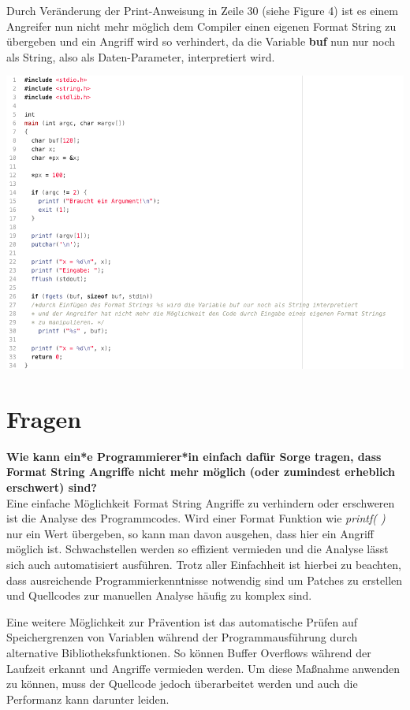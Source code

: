 \documentclass[12pt,a4paper]{article}
\begin{document}
	Durch Veränderung der Print-Anweisung in Zeile 30 (siehe Figure 4) ist es einem Angreifer nun nicht mehr möglich dem Compiler einen eigenen Format String zu übergeben und ein Angriff wird so verhindert, da die Variable \textbf{buf} nun nur noch als String, also als Daten-Parameter, interpretiert wird.

\begin{center}
	\includegraphics[scale=0.4]{betterCode.png}
\end{center}
	
	\section*{Fragen}
	\textbf{Wie kann ein*e Programmierer*in einfach dafür Sorge tragen, dass Format String Angriffe nicht mehr möglich (oder zumindest erheblich erschwert) sind?} \\
	Eine einfache Möglichkeit Format String Angriffe zu verhindern oder erschweren ist die Analyse des Programmcodes. Wird einer Format Funktion wie \textit{printf( )} nur ein Wert übergeben, so kann man davon ausgehen, dass hier ein Angriff möglich ist. Schwachstellen werden so effizient vermieden und die Analyse lässt sich auch automatisiert ausführen. Trotz aller Einfachheit ist hierbei zu beachten, dass ausreichende Programmierkenntnisse notwendig sind um Patches zu erstellen und Quellcodes zur manuellen Analyse häufig zu komplex sind. 
	\bigskip

	Eine weitere Möglichkeit zur Prävention ist das automatische Prüfen auf Speichergrenzen von Variablen während der Programmausführung durch alternative Bibliotheksfunktionen. So können Buffer Overflows während der Laufzeit erkannt und Angriffe vermieden werden. Um diese Maßnahme anwenden zu können, muss der Quellcode jedoch überarbeitet werden und auch die Performanz kann darunter leiden.
	\bigskip
	
\end{document}
